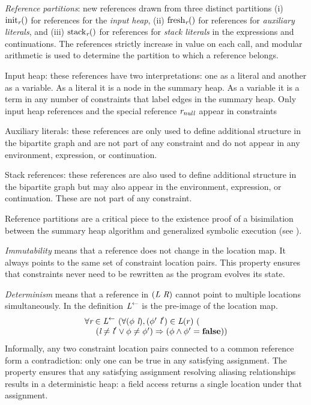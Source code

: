 \emph{Reference partitions}: new references drawn from
  three distinct partitions (i) $\mathrm{init}_{\emph{r}}()$ for references for the \emph{input heap}, (ii) $\mathrm{fresh}_{\emph{r}}()$ for references for \emph{auxiliary literals}, and
  (iii) $\mathrm{stack}_{\emph{r}}()$ for references for \emph{stack literals} in the expressions and
  continuations. The references strictly increase in value on each
  call, and modular arithmetic is used to determine the partition to
  which a reference belongs.
\begin{compactdesc}
\item[Input heap:] these references have two
  interpretations: one as a literal and another as a variable. As a literal it is a node in
  the summary heap. As a variable it is a term in any number of constraints that label
  edges in the summary heap. Only input heap references and the
  special reference $\emph{r}_\mathit{null}$ appear in constraints
\item[Auxiliary literals:] these references are only used to define additional structure in
  the bipartite graph and are not part of any constraint and do not appear
  in any environment, expression, or continuation.
\item[Stack references:] these references are also used to define additional structure in the bipartite graph but may also appear in the environment, expression, or continuation. These are not part of any constraint.
\end{compactdesc}
Reference partitions are a critical piece to the existence proof of a
bisimilation between the summary heap algorithm and generalized
symbolic execution (see ).

\emph{Immutability} means that a reference does not change in the
location map. It always points to the same set of constraint location
pairs. This property ensures that constraints never need to be
rewritten as the program evolves its state.

\emph{Determinism} means that a reference in $(\emph{L}\ \emph{R})$ cannot point to multiple locations simultaneously. In the definition $\emph{L}^\leftarrow$ is the pre-image of the location map.
$$
\begin{array}{l}
\forall \cfgnt{r} \in \cfgnt{L}^\leftarrow\ (\forall (\phi\ \cfgnt{l}),(\phi^\prime\ \cfgnt{l}^\prime) \in \cfgnt{L}(r)\ (\\
\ \ \ \ (\cfgnt{l} \neq \cfgnt{l}^\prime \vee \phi \neq \phi^\prime) \Rightarrow (\phi \wedge \phi^\prime = \cfgt{false}))
\end{array}
$$
Informally, any two constraint location pairs connected to a
common reference form a contradiction: only one can be true in any
satisfying assignment. The property ensures that any satisfying assignment
resolving aliasing relationships results in a deterministic heap: a
field access returns a single location under that assignment.

